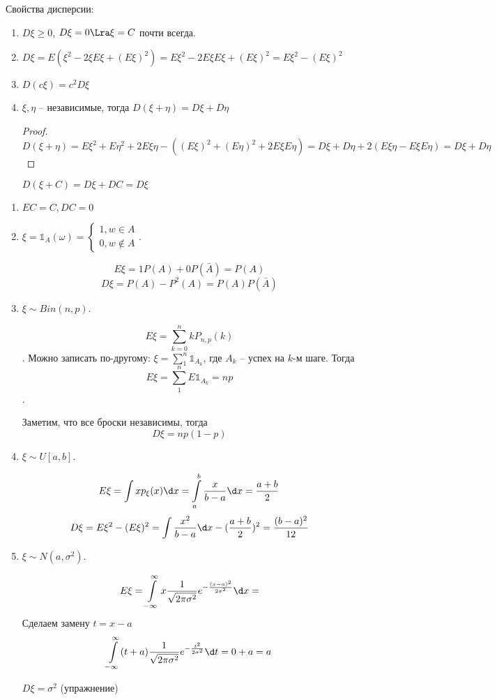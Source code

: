 Свойства дисперсии:
\begin{enumerate}
\item $D\xi \geq 0$, $D \xi = 0 \Lra \xi = C$ почти всегда. 

\item $D \xi = E (\xi ^2 - 2\xi E\xi + (E \xi) ^ 2) = E\xi^2 - 2E\xi E\xi + (E\xi) ^2 = E\xi^2 - (E\xi)^2$

\item $D(c \xi) = c^2 D \xi$

\item $\xi, \eta$ -- независимые, тогда $D(\xi + \eta) = D\xi + D\eta$
\begin{proof}
$D(\xi + \eta) = E\xi^2 + E\eta^2 + 2E\xi\eta - ((E\xi)^2 + (E\eta)^2+ 2E\xi E\eta) = D\xi + D\eta + 2(E\xi \eta - E \xi E\eta) = D\xi + D\eta$
\end{proof}
\begin{conseq}
$D(\xi + C) = D\xi + DC = D\xi$
\end{conseq}
\end{enumerate}

\begin{exmp}

\begin{enumerate}

\item $EC = C, DC = 0$
\item $\xi = \mathbb{1}_A(\omega) = \begin{cases} 1, w \in A \\ 0, w \notin A \end{cases}$.

$$E\xi = 1 P(A) + 0 P(\bar A) = P(A)$$
$$D\xi = P(A) - P^2(A) = P(A) P(\bar A)$$
\item $\xi \sim Bin(n, p)$. 

$$E\xi = \sum\limits_{k=0}^n k P_{n, p}(k)$$. 
Можно записать по-другому: $\xi = \sum\limits_1^n \mathbb{1}_{A_k}$, где $A_k$ -- успех на $k$-м шаге. Тогда $$E\xi = \sum\limits_1^n E \mathbb{1}_{A_k} = np$$.

Заметим, что все броски независимы, тогда 
$$D\xi = n p (1-p)$$

\item $\xi \sim U[a, b]$. 

$$E \xi = \int x p_\xi(x) \d x = \int\limits_a^b \frac{x}{b - a} \d x = \frac{a + b}{2}$$
$$D \xi = E\xi^2 - (E\xi)^2 = \int\frac{x^2}{b-a}\d x - (\frac{a + b}{2})^2 = \frac{(b - a)^2}{12}$$

\item
$\xi \sim N(a, \sigma^2)$.

$$E\xi = \int\limits_{-\infty}^{\infty} x \frac{1}{\sqrt{2\pi \sigma^2}} e^{-\frac{(x - a)^2}{2\sigma^2}} \d x = $$
Сделаем замену $t = x - a$
$$\int\limits_{-\infty}^\infty (t + a)\frac{1}{\sqrt{2\pi \sigma^2}} e^{-\frac{t^2}{2\sigma^2}} \d t = 0 + a = a$$

$D\xi = \sigma^2$ (упражнение)
\end{enumerate}
\end{exmp}


